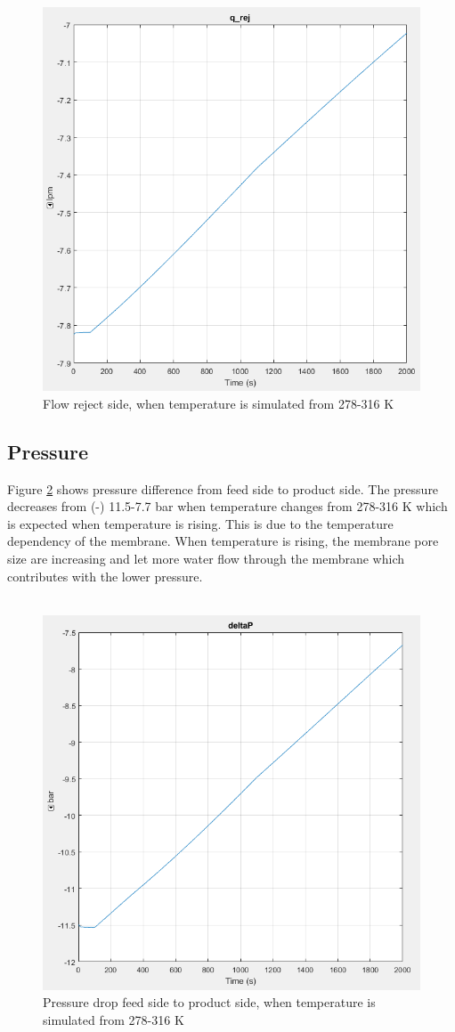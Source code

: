 \begin{figure}[h]
  \centering
  \includegraphics[width=0.7\linewidth]{q_rej.PNG}
  \caption{Flow reject side, when temperature is simulated from 278-316 K}
  \label{fig:qrej}
\end{figure}
\newpage

\subsection{Pressure}
Figure \ref{fig:deltap} shows pressure difference from feed side to product side. The pressure decreases from (-) 11.5-7.7 bar when temperature changes from 278-316 K which is expected when temperature is rising. This is due to the temperature dependency of the membrane. When temperature is rising, the membrane pore size are increasing and let more water flow through the membrane which contributes with the lower pressure. \\
\\
\begin{figure}[h]
  \centering
  \includegraphics[width=0.7\linewidth]{deltap.PNG}
  \caption{Pressure drop feed side to product side, when temperature is simulated from 278-316 K}
  \label{fig:deltap}
\end{figure}
\newpage


